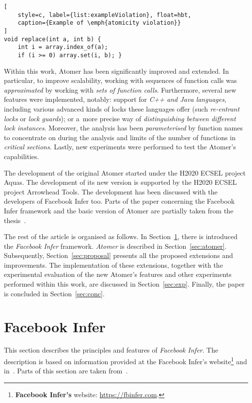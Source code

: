 \documentclass{ExcelAtFIT}
\theoremstyle{definition}
\begin{document}
\begin{lstlisting}[
    style=c, label={list:exampleViolation}, float=hbt,
    caption={Example of \emph{atomicity violation}}
]
void replace(int a, int b) {
    int i = array.index_of(a);
    if (i >= 0) array.set(i, b); }
\end{lstlisting}

Within this work, Atomer has been significantly improved and extended. In particular, to improve scalability, working with sequences of function calls was \emph{approximated} by working with \emph{sets of function calls}. Furthermore, several new features were implemented, notably: support for \emph{C++ and Java languages}, including various advanced kinds of locks these languages offer (such \emph{re-entrant locks} or \emph{lock guards}); or a~more precise way of \emph{distinguishing between different lock instances}. Moreover, the analysis has been \emph{parameterised} by function names to concentrate on during the analysis and limits of the number of functions in \emph{critical sections}. Lastly, new experiments were performed to test the Atomer's capabilities.

The development of the original Atomer started under the H2020 ECSEL project Aquas. The development of its new version is supported by the H2020 ECSEL project Arrowhead Tools. The development has been discussed with the developers of Facebook Infer too. Parts of the paper concerning the Facebook Infer framework and the basic version of Atomer are partially taken from the thesis~\cite{harmimBP}.

The rest of the article is organised as follows. In Section~\ref{sec:infer}, there is introduced the \emph{Facebook Infer} framework. \emph{Atomer} is described in Section~\ref{sec:atomer}. Subsequently, Section~\ref{sec:proposal} presents all the proposed extensions and improvements. The implementation of these extensions, together with the experimental evaluation of the new Atomer's features and other experiments performed within this work, are discussed in Section~\ref{sec:exp}. Finally, the paper is concluded in Section~\ref{sec:conc}.


\section{Facebook Infer}
\label{sec:infer}

This section describes the principles and features of \emph{Facebook Infer}. The description is based on information provided at the Facebook Infer's website\footnote{\textbf{Facebook Infer's} website: \url{https://fbinfer.com}.} and in~\cite{inferAISpeech}. Parts of this section are taken from~\cite{harmimBP}.
\end{document}
